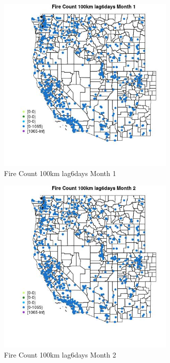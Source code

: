 \begin{figure} 
\centering  
\includegraphics[width=0.77\textwidth]{Code_Outputs/Report_ML_input_PM25_Step4_part_f_de_duplicated_aves_prioritize_24hr_obswNAs_MapObsMo1Fire_Count_100km_lag6days.jpg} 
\caption{\label{fig:Report_ML_input_PM25_Step4_part_f_de_duplicated_aves_prioritize_24hr_obswNAsMapObsMo1Fire_Count_100km_lag6days}Fire Count 100km lag6days Month 1} 
\end{figure} 
 

\begin{figure} 
\centering  
\includegraphics[width=0.77\textwidth]{Code_Outputs/Report_ML_input_PM25_Step4_part_f_de_duplicated_aves_prioritize_24hr_obswNAs_MapObsMo2Fire_Count_100km_lag6days.jpg} 
\caption{\label{fig:Report_ML_input_PM25_Step4_part_f_de_duplicated_aves_prioritize_24hr_obswNAsMapObsMo2Fire_Count_100km_lag6days}Fire Count 100km lag6days Month 2} 
\end{figure} 
 

